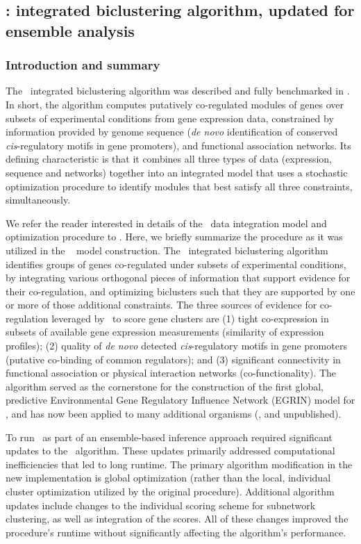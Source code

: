 \subsection{\cm: integrated biclustering algorithm, updated for ensemble analysis}

\subsubsection{Introduction and summary}

The \cm\ integrated biclustering algorithm was described and fully
benchmarked in \cite{Reiss2006n}. In short, the algorithm computes
putatively co-regulated modules of genes over subsets of experimental
conditions from gene expression data, constrained by information
provided by genome sequence (\textit{de novo} identification of
conserved \textit{cis}-regulatory motifs in gene promoters), and functional
association networks. Its defining characteristic is that it
combines all three types of data (expression, sequence and networks)
together into an integrated model that uses a stochastic
optimization procedure to identify modules that best satisfy all three
constraints, simultaneously.

We refer the reader interested in details of the \cm\ data integration
model and optimization procedure to \cite{Reiss2006n}. Here, we
briefly summarize the procedure as it was utilized in the \egrine~
model construction. The \cm\ integrated biclustering algorithm
identifies groups of genes co-regulated under subsets of experimental
conditions, by integrating various orthogonal pieces of information
that support evidence for their co-regulation, and optimizing
biclusters such that they are supported by one or more of those
additional constraints. The three sources of evidence for
co-regulation leveraged by \cm\ to score gene clusters are (1)
tight co-expression in subsets of available gene expression
measurements (similarity of expression profiles); (2) quality of
\textit{de novo} detected \textit{cis}-regulatory motifs in gene
promoters (putative co-binding of common regulators); and (3)
significant connectivity in functional association or physical
interaction networks (co-functionality). The algorithm served as the
cornerstone for the construction of the first global, predictive
Environmental Gene Regulatory Influence Network (EGRIN) model for
\halo \cite{Bonneau2007}, and has now been applied to many additional
organisms (\eg, \cite{Yoon2013} and unpublished).

To run \cm\ as part of an ensemble-based inference approach required
significant updates to the \cm\ algorithm. These updates primarily
addressed computational inefficiencies that led to long runtime. The
primary algorithm modification in the new implementation is global
optimization (rather than the local, individual cluster optimization
utilized by the original procedure). Additional algorithm updates
include changes to the individual scoring scheme for subnetwork
clustering, as well as integration of the scores. All of these changes
improved the procedure's runtime without significantly affecting the
algorithm's performance.

